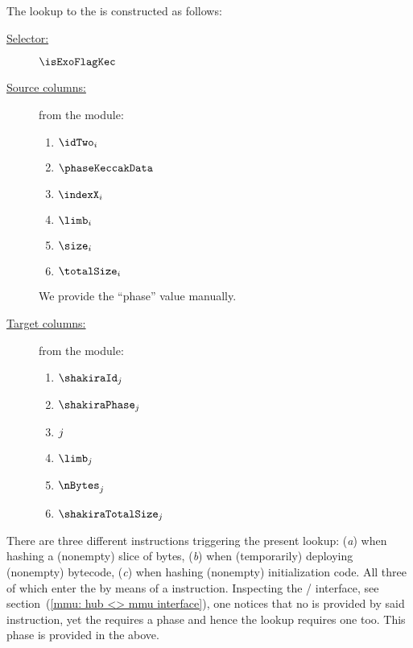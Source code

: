 The lookup to the \shakiraMod{} is constructed as follows:
\begin{description}
	\item[\underline{Selector:}] $\isExoFlagKec$
	\item[\underline{Source columns:}] from the \mmioMod{} module:
		\begin{multicols}{3}
			\begin{enumerate}
				\item $\idTwo_{i}$
				\item $\phaseKeccakData$
				\item $\indexX_{i}$
				\item $\limb_{i}$
				\item $\size_{i}$
				\item $\totalSize_{i}$
			\end{enumerate}
		\end{multicols}
		\saNote{}
		We provide the ``phase'' value manually.
	\item[\underline{Target columns:}] from the \shakiraMod{} module:
		\begin{multicols}{3}
			\begin{enumerate}
				\item $\shakiraId_{j}$
				\item $\shakiraPhase_{j}$
				\item $\index_{j}$
				\item $\limb_{j}$
				\item $\nBytes_{j}$
				\item $\shakiraTotalSize_{j}$
			\end{enumerate}
		\end{multicols}
\end{description}

\saNote{} There are three different \hubMod{} instructions triggering the present lookup:
(\emph{a})  when hashing a (nonempty) slice of bytes,
(\emph{b})  when (temporarily) deploying (nonempty) bytecode,
(\emph{c})  when hashing (nonempty) initialization code.
All three of which enter the \mmuMod{} by means of a \mmuInstRamToExoWithPadding{} instruction.
Inspecting the \hubMod{} / \mmuMod{} interface, see section~(\ref{mmu: hub <> mmu interface}), one notices that no \macroPhase{} is provided by said instruction, yet the \shakiraMod{} requires a phase and hence the lookup requires one too. This phase is provided in the above.
